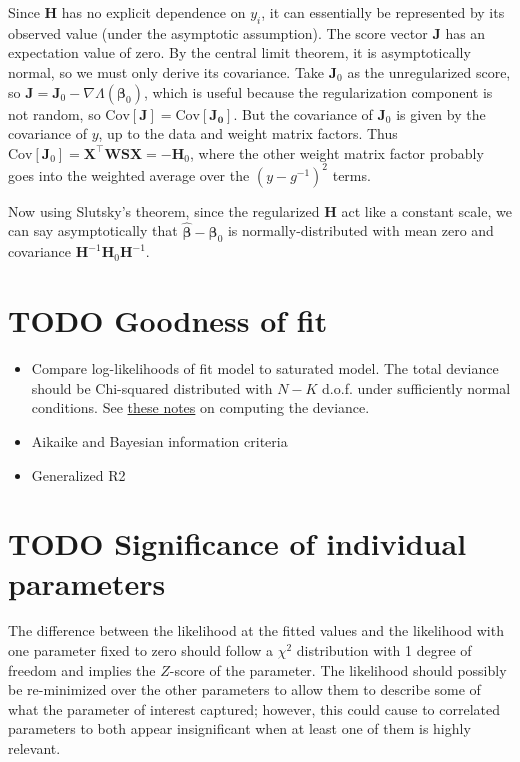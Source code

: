 \documentclass{article}
\begin{document}
Since $\mathbf{H}$ has no explicit dependence on $y_i$, it can essentially be
represented by its observed value (under the asymptotic assumption). The score
vector \(\mathbf{J}\) has an expectation value of zero. By the central limit
theorem, it is asymptotically normal, so we must only derive its covariance.
Take $\mathbf{J}_0$ as the unregularized score, so \(\mathbf{J} = \mathbf{J}_0
- \nabla \Lambda(\boldsymbol\beta_0)\), which is useful because the
regularization component is not random, so \( \textrm{Cov}[\mathbf{J}] =
\textrm{Cov}[\mathbf{J_0}]\). But the covariance of $\mathbf{J}_0$ is given by
the covariance of $y$, up to the data and weight matrix factors. Thus 
\(\textrm{Cov}[\mathbf{J}_0] = \mathbf{X^\intercal WSX} = -\mathbf{H}_0\),
where the other weight matrix factor probably goes into the weighted average
over the $(y-g^{-1})^2$ terms.

Now using Slutsky's theorem, since the regularized $\mathbf{H}$ act like a
constant scale, we can say asymptotically that \(\hat{\boldsymbol\beta} -
\boldsymbol\beta_0\) is normally-distributed with mean zero and covariance
\(\mathbf{H}^{-1} \mathbf{H}_0 \mathbf{H}^{-1}\).


\section{TODO Goodness of fit}

\begin{itemize}
\item Compare log-likelihoods of fit model to saturated model. The total
  deviance should be Chi-squared distributed with \(N -K\) d.o.f. under
  sufficiently normal conditions.
See \href{http://people.stat.sfu.ca/~raltman/stat402/402L11.pdf}{these notes} on computing the deviance.
\item Aikaike and Bayesian information criteria
\item Generalized R2
\end{itemize}

\section{TODO Significance of individual parameters}

The difference between the likelihood at the fitted values and the likelihood
with one parameter fixed to zero should follow a \(\chi^2\) distribution with
1 degree of freedom and implies the \(Z\)-score of the parameter. The
likelihood should possibly be re-minimized over the other parameters to allow
them to describe some of what the parameter of interest captured; however, this
could cause to correlated parameters to both appear insignificant when at least
one of them is highly relevant.
\end{document}
